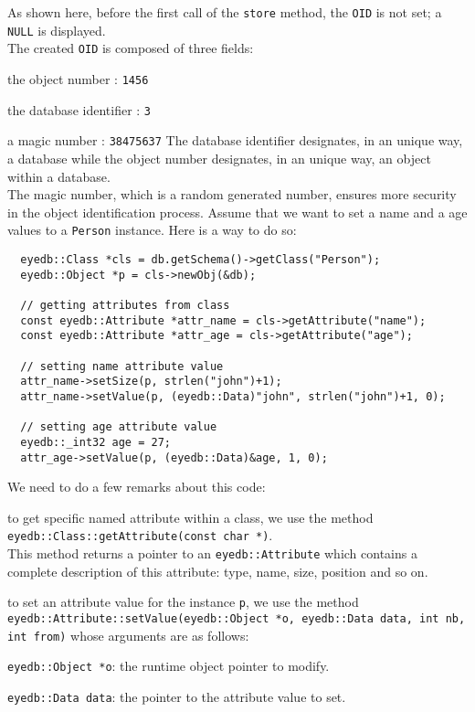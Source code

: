 \normalsize
As shown here, before the first call of the \texttt{store} method, the \texttt{OID} is
not set; a \texttt{NULL} is displayed.
\\
The created \texttt{OID} is composed of three fields:
\be
\item the object number : \texttt{1456}
\item the database identifier : \texttt{3}
\item a magic number : \texttt{38475637}
\ee
The database identifier designates, in an unique way, a database while
the object number designates, in an unique way, an object within a database.
\\
The magic number, which is a random generated number, ensures more security
in the object identification process.
Assume that we want to set a name and a age values to a \texttt{Person} instance.
Here is a way to do so:
\verbsize
\begin{verbatim}
  eyedb::Class *cls = db.getSchema()->getClass("Person");
  eyedb::Object *p = cls->newObj(&db);

  // getting attributes from class
  const eyedb::Attribute *attr_name = cls->getAttribute("name");
  const eyedb::Attribute *attr_age = cls->getAttribute("age");

  // setting name attribute value
  attr_name->setSize(p, strlen("john")+1);
  attr_name->setValue(p, (eyedb::Data)"john", strlen("john")+1, 0);

  // setting age attribute value
  eyedb::_int32 age = 27;
  attr_age->setValue(p, (eyedb::Data)&age, 1, 0);
\end{verbatim}
\normalsize
We need to do a few remarks about this code:
\be
\item to get specific named attribute within a class,
we use the method \texttt{eyedb::Class::getAttribute(const char *)}.
\\
This method returns a pointer to an \texttt{eyedb::Attribute} which contains
a complete description of this attribute: type, name, size, position and
so on.
\item to set an attribute value for the instance \texttt{p}, we
use the method \texttt{eyedb::Attribute::setValue(eyedb::Object *o, eyedb::Data data,
int nb, int from)} whose arguments are as follows:
\be
\item \texttt{eyedb::Object *o}: the runtime object pointer to modify.
\item \texttt{eyedb::Data data}: the pointer to the attribute value to set.
